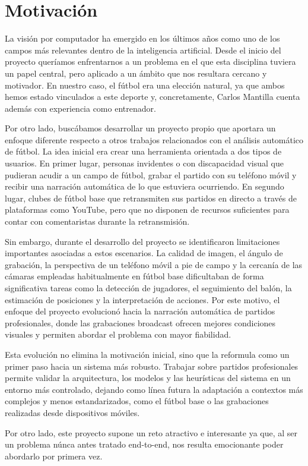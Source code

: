 \section{Motivación}

La visión por computador ha emergido en los últimos años como uno de los campos más relevantes dentro de la inteligencia artificial. Desde el inicio del proyecto queríamos enfrentarnos a un problema en el que esta disciplina tuviera un papel central, pero aplicado a un ámbito que nos resultara cercano y motivador. En nuestro caso, el fútbol era una elección natural, ya que ambos hemos estado vinculados a este deporte y, concretamente, Carlos Mantilla cuenta además con experiencia como entrenador.

Por otro lado, buscábamos desarrollar un proyecto propio que aportara un enfoque diferente respecto a otros trabajos relacionados con el análisis automático de fútbol. La idea inicial era crear una herramienta orientada a dos tipos de usuarios. En primer lugar, personas invidentes o con discapacidad visual que pudieran acudir a un campo de fútbol, grabar el partido con su teléfono móvil y recibir una narración automática de lo que estuviera ocurriendo. En segundo lugar, clubes de fútbol base que retransmiten sus partidos en directo a través de plataformas como YouTube, pero que no disponen de recursos suficientes para contar con comentaristas durante la retransmisión.

Sin embargo, durante el desarrollo del proyecto se identificaron limitaciones importantes asociadas a estos escenarios. La calidad de imagen, el ángulo de grabación, la perspectiva de un teléfono móvil a pie de campo y la cercanía de las cámaras empleadas habitualmente en fútbol base dificultaban de forma significativa tareas como la detección de jugadores, el seguimiento del balón, la estimación de posiciones y la interpretación de acciones. Por este motivo, el enfoque del proyecto evolucionó hacia la narración automática de partidos profesionales, donde las grabaciones broadcast ofrecen mejores condiciones visuales y permiten abordar el problema con mayor fiabilidad.

Esta evolución no elimina la motivación inicial, sino que la reformula como un primer paso hacia un sistema más robusto. Trabajar sobre partidos profesionales permite validar la arquitectura, los modelos y las heurísticas del sistema en un entorno más controlado, dejando como línea futura la adaptación a contextos más complejos y menos estandarizados, como el fútbol base o las grabaciones realizadas desde dispositivos móviles.

Por otro lado, este proyecto supone un reto atractivo e interesante ya que, al ser un problema núnca antes tratado end-to-end, nos resulta emocionante poder abordarlo por primera vez.